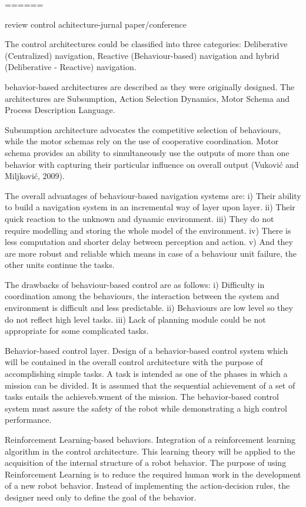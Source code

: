 
======

review control achitecture-jurnal paper/conference

The control architectures could be classified into three categories: Deliberative (Centralized) navigation, Reactive (Behaviour-based) navigation and hybrid (Deliberative - Reactive) navigation.

behavior-based architectures are described as they were originally
designed. The architectures are Subsumption, Action Selection Dynamics, Motor Schema and Process Description Language.


Subsumption architecture advocates the competitive
selection of behaviours, while the motor schemas rely on the use of cooperative coordination. Motor schema provides an ability to simultaneously use the outputs of more than one behavior with capturing their particular influence on overall output (Vuković and Miljković, 2009).

The overall advantages of behaviour-based navigation systems are:
i) Their ability to build a navigation system in an incremental way of layer upon layer.
ii) Their quick reaction to the unknown and dynamic environment. 
iii) They do not require modelling and storing the whole model of the environment. 
iv) There is less computation and shorter delay between perception and action. 
v) And they are more robust and reliable which means in case of a behaviour unit failure, the other units continue the tasks.

The drawbacks of behaviour-based control are as follows:
i) Difficulty in coordination among the behaviours, the interaction between the system and environment is difficult and less predictable.
 ii) Behaviours are low level so they do not reflect high level tasks. 
 iii) Lack of planning module could be not appropriate for some complicated tasks.
 
 
 
 Behavior-based control layer. Design of a behavior-based control system
which will be contained in the overall control architecture with the purpose of accomplishing simple tasks. A task is intended as one of the phases in which a mission can be divided. It is assumed that the sequential achievement of a set of tasks entails the achieveb.wment of the mission. The behavior-based control system must assure the safety of
 the robot while demonstrating a high control performance.
 
 Reinforcement Learning-based behaviors. Integration of a reinforcement learning algorithm in the control architecture. This learning theory
 will be applied to the acquisition of the internal structure of a robot
 behavior. The purpose of using Reinforcement Learning is to reduce
 the required human work in the development of a new robot behavior.
 Instead of implementing the action-decision rules, the designer need
 only to define the goal of the behavior.
 

